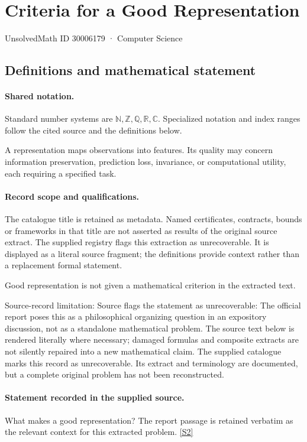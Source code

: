 \documentclass[11pt]{article}
\newcommand{\sref}[2]{\hyperlink{source:#1:#2}{[S#2]}}
\begin{document}
\setcounter{section}{30006178}
\section{Criteria for a Good Representation}\label{30006179}
{\small\sffamily UnsolvedMath ID 30006179 · Computer Science}
\subsection{Definitions and mathematical statement}

\paragraph{Shared notation.}Standard number systems are $\mathbb N,\mathbb Z,\mathbb Q,\mathbb R,\mathbb C$. Specialized notation and index ranges follow the cited source and the definitions below.


A representation maps observations into features. Its quality may concern information preservation, prediction loss, invariance, or computational utility, each requiring a specified task.
\paragraph{Record scope and qualifications.}
The catalogue title is retained as metadata. Named certificates, contracts, bounds or frameworks in that title are not asserted as results of the original source extract.
The supplied registry flags this extraction as unrecoverable. It is displayed as a literal source fragment; the definitions provide context rather than a replacement formal statement.

Good representation is not given a mathematical criterion in the extracted text.

Source-record limitation: Source flags the statement as unrecoverable: The official report poses this as a philosophical organizing question in an expository discussion, not as a standalone mathematical problem.
The source text below is rendered literally where necessary; damaged formulas and composite extracts are not silently repaired into a new mathematical claim.
The supplied catalogue marks this record as unrecoverable. Its extract and terminology are documented, but a complete original problem has not been reconstructed.
\paragraph{Statement recorded in the supplied source.}
What makes a good representation? The report passage is retained verbatim as the relevant context for this extracted problem. \sref{30006179}{2}
\end{document}
